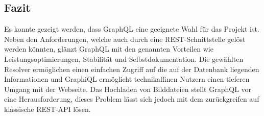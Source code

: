 \subsection{Fazit}
Es konnte gezeigt werden, dass GraphQL eine geeignete Wahl für das Projekt ist.
Neben den Anforderungen, welche auch durch eine REST-Schnittstelle gelöst werden könnten, glänzt GraphQL mit den genannten Vorteilen wie Leistungsoptimierungen, Stabilität und Selbstdokumentation.
Die gewählten Resolver ermöglichen einen einfachen Zugriff auf die auf der Datenbank liegenden Informationen und GraphiQL ermöglicht technikaffinen Nutzern einen tieferen Umgang mit der Webseite.
Das Hochladen von Bilddateien stellt GraphQL vor eine Herausforderung, dieses Problem lässt sich jedoch mit dem zurückgreifen auf klassische REST-API lösen.